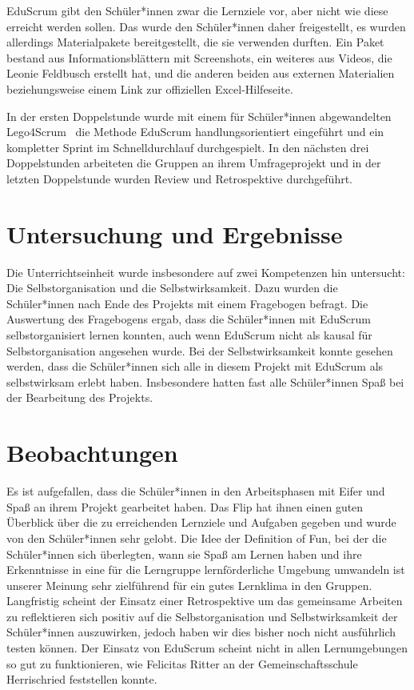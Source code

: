 \documentclass[twoside,twocolumn]{article}
\begin{document}
EduScrum gibt den Schüler*innen zwar die Lernziele vor, aber nicht wie diese erreicht werden sollen. Das wurde den Schüler*innen daher freigestellt, es wurden allerdings Materialpakete bereitgestellt, die sie verwenden durften. Ein Paket bestand aus Informationsblättern mit Screenshots, ein weiteres aus Videos, die Leonie Feldbusch erstellt hat, und die anderen beiden aus externen Materialien beziehungsweise einem Link zur offiziellen Excel-Hilfeseite.

In der ersten Doppelstunde wurde mit einem für Schüler*innen abgewandelten Lego4Scrum~\cite{lego} die Methode EduScrum handlungsorientiert eingeführt und ein kompletter Sprint im Schnelldurchlauf durchgespielt. In den nächsten drei Doppelstunden arbeiteten die Gruppen an ihrem Umfrageprojekt und in der letzten Doppelstunde wurden Review und Retrospektive durchgeführt. 


\section{Untersuchung und Ergebnisse}

Die Unterrichtseinheit wurde insbesondere auf zwei Kompetenzen hin untersucht: Die Selbstorganisation und die Selbstwirksamkeit. Dazu wurden die Schüler*innen nach Ende des Projekts mit einem Fragebogen befragt. Die Auswertung des Fragebogens ergab, dass die Schüler*innen mit EduScrum selbstorganisiert lernen konnten, auch wenn EduScrum nicht als kausal für Selbstorganisation angesehen wurde. Bei der Selbstwirksamkeit konnte gesehen werden, dass die Schüler*innen sich alle in diesem Projekt mit EduScrum als selbstwirksam erlebt haben. Insbesondere hatten fast alle Schüler*innen Spaß bei der Bearbeitung des Projekts.

\section{Beobachtungen}

Es ist aufgefallen, dass die Schüler*innen in den Arbeitsphasen mit Eifer und Spaß an ihrem Projekt gearbeitet haben. Das Flip hat ihnen einen guten Überblick über die zu erreichenden Lernziele und Aufgaben gegeben und wurde von den Schüler*innen sehr gelobt. Die Idee der Definition of Fun, bei der die Schüler*innen sich überlegten, wann sie Spaß am Lernen haben und ihre Erkenntnisse in eine für die Lerngruppe lernförderliche Umgebung umwandeln ist unserer Meinung sehr zielführend für ein gutes Lernklima in den Gruppen. Langfristig scheint der Einsatz einer Retrospektive um das gemeinsame Arbeiten zu reflektieren sich positiv auf die Selbstorganisation und Selbstwirksamkeit der Schüler*innen auszuwirken, jedoch haben wir dies bisher noch nicht ausführlich testen können. Der Einsatz von EduScrum scheint nicht in allen Lernumgebungen so gut zu funktionieren, wie Felicitas Ritter an der Gemeinschaftsschule Herrischried feststellen konnte.
\end{document}
